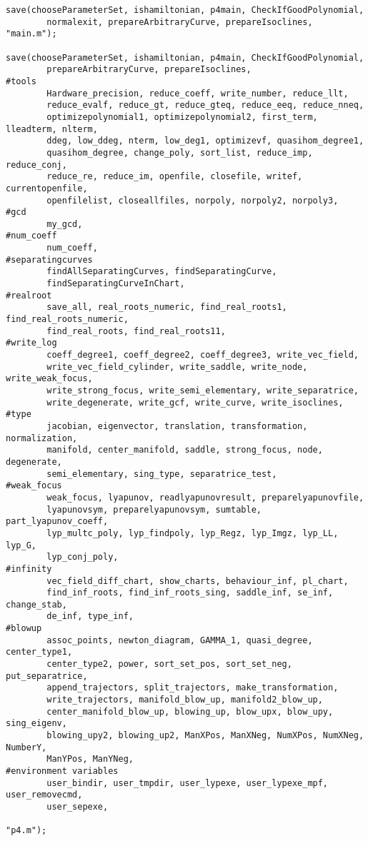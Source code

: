 \documentclass[a4paper,10pt]{article}
\begin{document}
\begin{lstlisting}[name=main]
save(chooseParameterSet, ishamiltonian, p4main, CheckIfGoodPolynomial,
        normalexit, prepareArbitraryCurve, prepareIsoclines, "main.m");

save(chooseParameterSet, ishamiltonian, p4main, CheckIfGoodPolynomial,
        prepareArbitraryCurve, prepareIsoclines,
#tools
        Hardware_precision, reduce_coeff, write_number, reduce_llt,
        reduce_evalf, reduce_gt, reduce_gteq, reduce_eeq, reduce_nneq,
        optimizepolynomial1, optimizepolynomial2, first_term, lleadterm, nlterm,
        ddeg, low_ddeg, nterm, low_deg1, optimizevf, quasihom_degree1,
        quasihom_degree, change_poly, sort_list, reduce_imp, reduce_conj,
        reduce_re, reduce_im, openfile, closefile, writef, currentopenfile, 
        openfilelist, closeallfiles, norpoly, norpoly2, norpoly3,
#gcd
        my_gcd,
#num_coeff
        num_coeff,
#separatingcurves
        findAllSeparatingCurves, findSeparatingCurve,
        findSeparatingCurveInChart,
#realroot
        save_all, real_roots_numeric, find_real_roots1, find_real_roots_numeric,
        find_real_roots, find_real_roots11,
#write_log
        coeff_degree1, coeff_degree2, coeff_degree3, write_vec_field,
        write_vec_field_cylinder, write_saddle, write_node, write_weak_focus,
        write_strong_focus, write_semi_elementary, write_separatrice,
        write_degenerate, write_gcf, write_curve, write_isoclines,
#type
        jacobian, eigenvector, translation, transformation, normalization,
        manifold, center_manifold, saddle, strong_focus, node, degenerate,
        semi_elementary, sing_type, separatrice_test,
#weak_focus
        weak_focus, lyapunov, readlyapunovresult, preparelyapunovfile,
        lyapunovsym, preparelyapunovsym, sumtable, part_lyapunov_coeff,
        lyp_multc_poly, lyp_findpoly, lyp_Regz, lyp_Imgz, lyp_LL, lyp_G,
        lyp_conj_poly,
#infinity
        vec_field_diff_chart, show_charts, behaviour_inf, pl_chart,
        find_inf_roots, find_inf_roots_sing, saddle_inf, se_inf, change_stab,
        de_inf, type_inf,
#blowup
        assoc_points, newton_diagram, GAMMA_1, quasi_degree, center_type1,
        center_type2, power, sort_set_pos, sort_set_neg, put_separatrice,
        append_trajectors, split_trajectors, make_transformation,
        write_trajectors, manifold_blow_up, manifold2_blow_up,
        center_manifold_blow_up, blowing_up, blow_upx, blow_upy, sing_eigenv,
        blowing_upy2, blowing_up2, ManXPos, ManXNeg, NumXPos, NumXNeg, NumberY,
        ManYPos, ManYNeg,
#environment variables
        user_bindir, user_tmpdir, user_lypexe, user_lypexe_mpf, user_removecmd,
        user_sepexe,

"p4.m");
\end{lstlisting}
\end{document}
